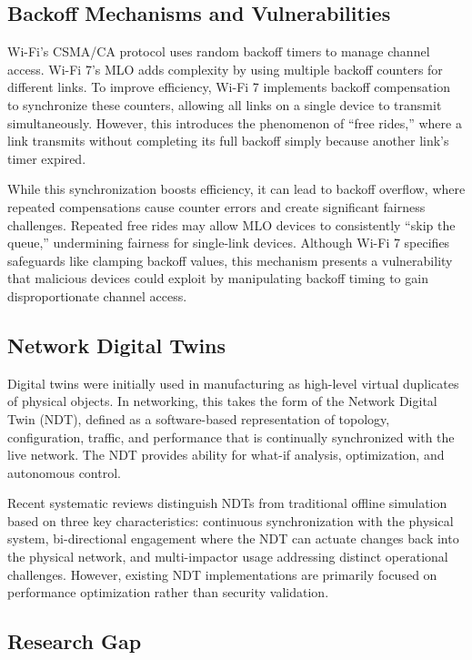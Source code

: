\documentclass[conference]{IEEEtran}
\begin{document}
\subsection{Backoff Mechanisms and Vulnerabilities}

Wi-Fi's CSMA/CA protocol uses random backoff timers to manage channel access. Wi-Fi 7's MLO adds complexity by using multiple backoff counters for different links. To improve efficiency, Wi-Fi 7 implements backoff compensation to synchronize these counters, allowing all links on a single device to transmit simultaneously. However, this introduces the phenomenon of ``free rides,'' where a link transmits without completing its full backoff simply because another link's timer expired.

While this synchronization boosts efficiency, it can lead to backoff overflow, where repeated compensations cause counter errors and create significant fairness challenges. Repeated free rides may allow MLO devices to consistently ``skip the queue,'' undermining fairness for single-link devices. Although Wi-Fi 7 specifies safeguards like clamping backoff values, this mechanism presents a vulnerability that malicious devices could exploit by manipulating backoff timing to gain disproportionate channel access.

\subsection{Network Digital Twins}

Digital twins were initially used in manufacturing as high-level virtual duplicates of physical objects. In networking, this takes the form of the Network Digital Twin (NDT), defined as a software-based representation of topology, configuration, traffic, and performance that is continually synchronized with the live network. The NDT provides ability for what-if analysis, optimization, and autonomous control.

Recent systematic reviews distinguish NDTs from traditional offline simulation based on three key characteristics: continuous synchronization with the physical system, bi-directional engagement where the NDT can actuate changes back into the physical network, and multi-impactor usage addressing distinct operational challenges. However, existing NDT implementations are primarily focused on performance optimization rather than security validation.

\subsection{Research Gap}
\end{document}
